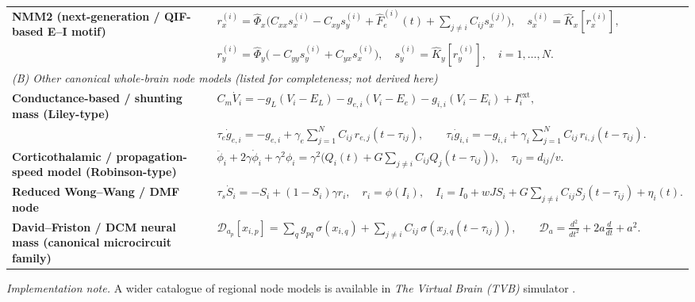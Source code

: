 \documentclass[12pt]{article}
\numberwithin{equation}{section}
\begin{document}
\begin{landscape}
\begin{tcolorbox}[
  colback=gray!5,
  colframe=slate,
  boxrule=0.4pt,
  enhanced,
  sharp corners,
  left=4pt,right=4pt,top=3pt,bottom=3pt,
  boxsep=2pt,
]
\begin{tabular}{p{} >{\centering\arraybackslash}p{}}
\textbf{NMM2 (next-generation / QIF-based E--I motif)} &
$\displaystyle
r_x^{(i)}=\hat{\Phi}_x\!\Big(C_{xx}s_x^{(i)}-C_{xy}s_y^{(i)}+\hat{F}_e^{(i)}(t)+\sum_{j\neq i} C_{ij}s_x^{(j)}\Big),\quad
s_x^{(i)}=\hat{K}_x[r_x^{(i)}],$
\\[-1mm]
& $\displaystyle
r_y^{(i)}=\hat{\Phi}_y\!\Big(-C_{yy}s_y^{(i)}+C_{yx}s_x^{(i)}\Big),\quad
s_y^{(i)}=\hat{K}_y[r_y^{(i)}],\quad i=1,\dots,N.$
\\
\hline

\multicolumn{2}{l}{\textit{(B) Other canonical whole-brain node models (listed for completeness; not derived here)}} \\
\hline

\textbf{Conductance-based / shunting mass (Liley-type) \cite{Dafilis2013}} &
$\displaystyle
C_m \dot{V}_i = -g_L(V_i-E_L) - g_{e,i}(V_i-E_e) - g_{i,i}(V_i-E_i) + I^{\mathrm{ext}}_i,$
\\[-1mm]
& $\displaystyle
\tau_{e}\dot{g}_{e,i}=-g_{e,i}+\gamma_e\sum_{j=1}^{N}C_{ij}\,r_{e,j}(t-\tau_{ij}),\qquad
\tau_{i}\dot{g}_{i,i}=-g_{i,i}+\gamma_i\sum_{j=1}^{N}C_{ij}\,r_{i,j}(t-\tau_{ij}).$
\\
\hline

\textbf{Corticothalamic / propagation-speed model (Robinson-type)\cite{Robinson2001,Rennie2002}} &
$\displaystyle
\ddot{\phi}_i + 2\gamma \dot{\phi}_i + \gamma^2\phi_i
= \gamma^2\Big(Q_i(t)+G\sum_{j\neq i}C_{ij}Q_j(t-\tau_{ij})\Big),\quad
\tau_{ij}=d_{ij}/v.$
\\
\hline

\textbf{Reduced Wong--Wang / DMF node \cite{WongWang2006,Deco2013}} &
$\displaystyle
\tau_s \dot{S}_i = -S_i + (1-S_i)\gamma r_i,\quad
r_i=\phi(I_i),\quad
I_i = I_0 + wJ S_i + G\sum_{j\neq i} C_{ij}S_j(t-\tau_{ij}) + \eta_i(t).$
\\
\hline

\textbf{David--Friston / DCM neural mass (canonical microcircuit family)\cite{DavidFriston2003}} &
$\displaystyle
\mathcal{D}_{a_p}[x_{i,p}]
= \sum_q g_{pq}\,\sigma(x_{i,q})
+ \sum_{j\neq i} C_{ij}\,\sigma(x_{j,q}(t-\tau_{ij})),
\qquad
\mathcal{D}_{a}=\frac{d^2}{dt^2}+2a\frac{d}{dt}+a^2.$
\\
\hline
\end{tabular}

\vspace{1mm}
\footnotesize
\noindent\textit{Implementation note.} A wider catalogue of regional node models is available in
\emph{The Virtual Brain (TVB)} simulator \cite{SanzLeon2013,SanzLeon2015}.
\end{tcolorbox}
\end{landscape}
\end{document}
